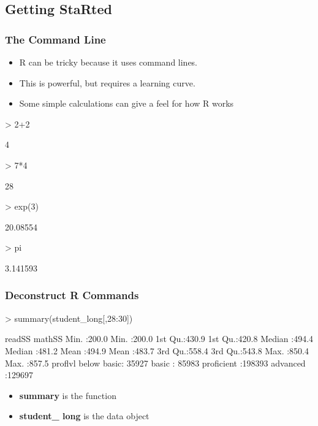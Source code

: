 \documentclass[12pt,handout]{beamer}
\begin{document}
\subsection{Getting StaRted}
\label{sec: start}

\begin{frame}[containsverbatim]
\frametitle{The Command Line}
\begin{itemize}
\item R can be tricky because it uses command lines.
\item This is powerful, but requires a learning curve.
\item Some simple calculations can give a feel for how R works
\end{itemize}
\begin{Schunk}
\begin{Sinput}
> 2+2
\end{Sinput}
\begin{Soutput}
[1] 4
\end{Soutput}
\begin{Sinput}
> 7*4
\end{Sinput}
\begin{Soutput}
[1] 28
\end{Soutput}
\begin{Sinput}
> exp(3)
\end{Sinput}
\begin{Soutput}
[1] 20.08554
\end{Soutput}
\begin{Sinput}
> pi
\end{Sinput}
\begin{Soutput}
[1] 3.141593
\end{Soutput}
\end{Schunk}
\end{frame}

\begin{frame}[containsverbatim]
\frametitle{Deconstruct R Commands}
\begin{Schunk}
\begin{Sinput}
> summary(student_long[,28:30])
\end{Sinput}
\begin{Soutput}
     readSS          mathSS     
 Min.   :200.0   Min.   :200.0  
 1st Qu.:430.9   1st Qu.:420.8  
 Median :494.4   Median :481.2  
 Mean   :494.9   Mean   :483.7  
 3rd Qu.:558.4   3rd Qu.:543.8  
 Max.   :850.4   Max.   :857.5  
        proflvl      
 below basic: 35927  
 basic      : 85983  
 proficient :198393  
 advanced   :129697  
\end{Soutput}
\end{Schunk}
\begin{itemize}
  \item \textbf{summary} is the function
  \item \textbf{student\_ long} is the data object
\end{itemize}
\end{frame}
\end{document}
